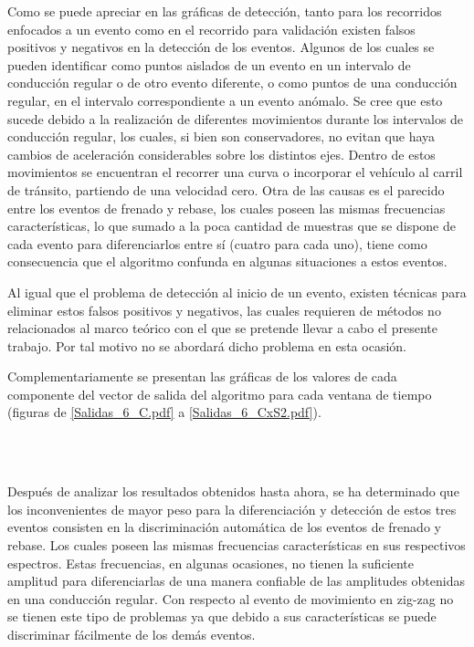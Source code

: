 Como se puede apreciar en las gráficas de detección, tanto para los recorridos enfocados a un evento como en el recorrido para validación existen falsos positivos y negativos en la detección de los eventos.
Algunos de los cuales se pueden identificar como puntos aislados de un evento en un intervalo de conducción regular o de otro evento diferente, o como puntos de una conducción regular, en el intervalo correspondiente a un evento anómalo.
Se cree que esto sucede debido a la realización de diferentes movimientos durante los intervalos de conducción regular, los cuales, si bien son conservadores, no evitan que haya cambios de aceleración considerables sobre los distintos ejes.
Dentro de estos movimientos se encuentran el recorrer una curva o incorporar el vehículo al carril de tránsito, partiendo de una velocidad cero.
Otra de las causas es el parecido entre los eventos de frenado y rebase, los cuales poseen las mismas frecuencias características, lo que sumado a la poca cantidad de muestras que se dispone de cada evento para diferenciarlos entre sí (cuatro para cada uno), tiene como consecuencia que el algoritmo confunda en algunas situaciones a estos eventos.

Al igual que el problema de detección al inicio de un evento, existen técnicas para eliminar estos falsos positivos y negativos, las cuales requieren de métodos no relacionados al marco teórico con el que se pretende llevar a cabo el presente trabajo.
Por tal motivo no se abordará dicho problema en esta ocasión.

Complementariamente se presentan las gráficas de los valores de cada componente del vector de salida del algoritmo para cada ventana de tiempo (figuras de \ref{Salidas_6_C.pdf} a \ref{Salidas_6_CxS2.pdf}).

\pagebreak
\ \\
\vspace{27cm}
\pagebreak
\ \\
\vspace{27cm}
\pagebreak

Después de analizar los resultados obtenidos hasta ahora, se ha determinado que los inconvenientes de mayor peso para la diferenciación y detección de estos tres eventos consisten en la discriminación automática de los eventos de frenado y rebase. 
Los cuales poseen las mismas frecuencias características en sus respectivos espectros. 
Estas frecuencias, en algunas ocasiones, no tienen la suficiente amplitud para diferenciarlas de una manera confiable de las amplitudes obtenidas en una conducción regular. 
Con respecto al evento de movimiento en zig-zag no se tienen este tipo de problemas ya que debido a sus características se puede discriminar fácilmente de los demás eventos.

